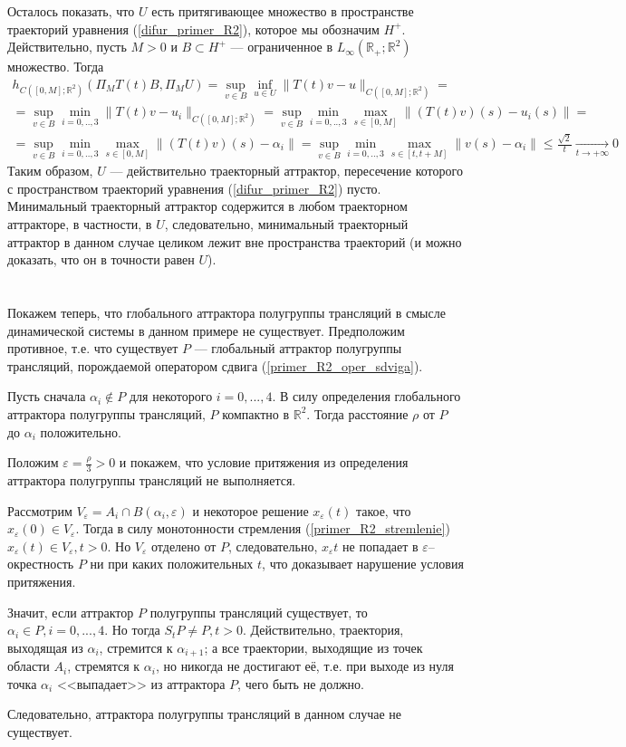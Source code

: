 Осталось показать, что $U$ есть притягивающее множество в пространстве траекторий уравнения (\ref{difur_primer_R2}),
которое мы обозначим $H^+$.
Действительно, пусть $M>0$ и $B\subset H^+$ --- ограниченное в $L_\infty(\mathbb{R}_+; \mathbb{R}^2)$ множество.
Тогда
\begin{multline*}
	h_{C([0,M];\mathbb{R}^2)}(\Pi_M T(t)B,\Pi_M U) =
	\sup_{v\in B} \inf_{u\in U} \| T(t) v - u \|_{C([0,M];\mathbb{R}^2)} =
	\\ =
	\sup_{v\in B} \min_{i=0,..,3} \| T(t) v - u_i \|_{C([0,M];\mathbb{R}^2)} =
	\sup_{v\in B} \min_{i=0,..,3} \max_{s\in[0,M]} \| (T(t) v)(s) - u_i(s) \| =
	\\ =
	\sup_{v\in B} \min_{i=0,..,3} \max_{s\in[0,M]} \| (T(t) v)(s) - \alpha_i \| =
	\sup_{v\in B} \min_{i=0,..,3} \max_{s\in[t,t+M]} \| v(s) - \alpha_i \| \leq
	\frac{\sqrt{2}}{t} \xrightarrow[t\to + \infty]{} 0
\end{multline*}
Таким образом, $U$ --- действительно траекторный аттрактор, пересечение которого с пространством траекторий
уравнения (\ref{difur_primer_R2}) пусто.
Минимальный траекторный аттрактор содержится в любом траекторном аттракторе, в частности, в $U$,
следовательно, минимальный траекторный аттрактор в данном случае целиком лежит вне пространства траекторий
(и можно доказать, что он в точности равен $U$).

\section{}

Покажем теперь, что глобального аттрактора полугруппы трансляций
в смысле динамической системы в данном примере не существует.
Предположим противное, т.е. что существует $P$ --- глобальный аттрактор полугруппы трансляций,
порождаемой оператором сдвига (\ref{primer_R2_oper_sdviga}).

Пусть сначала $\alpha_i \notin P$ для некоторого $i=0,...,4$.
В силу определения глобального аттрактора полугруппы трансляций,
$P$ компактно в $\mathbb{R}^2$.
Тогда расстояние $\rho$ от $P$ до $\alpha_i$ положительно.

Положим $\varepsilon = \frac{\rho}{3} > 0$ и покажем,
что условие притяжения из определения аттрактора полугруппы трансляций не выполняется.

Рассмотрим $V_\varepsilon = A_i \cap B(\alpha_i, \varepsilon)$ и некоторое решение $x_\varepsilon(t)$
такое, что $x_\varepsilon(0) \in V_\varepsilon$.
Тогда в силу монотонности стремления (\ref{primer_R2_stremlenie})
$x_\varepsilon(t) \in V_\varepsilon, t>0$.
Но $V_\varepsilon$ отделено от $P$, следовательно, $x_\varepsilon{t}$ не попадает в $\varepsilon$--окрестность $P$
ни при каких положительных $t$, что доказывает нарушение условия притяжения.

Значит, если аттрактор $P$ полугруппы трансляций существует, то $\alpha_i \in P, i=0,...,4$.
Но тогда $S_t P \ne P, t>0$.
Действительно, траектория, выходящая из $\alpha_i$, стремится к $\alpha_{i+1}$;
а все траектории, выходящие из точек области $A_i$, стремятся к $\alpha_i$,
но никогда не достигают её,
т.е. при выходе из нуля точка $\alpha_i$ <<выпадает>> из аттрактора $P$, чего быть не должно.

Следовательно, аттрактора полугруппы трансляций в данном случае не существует.
